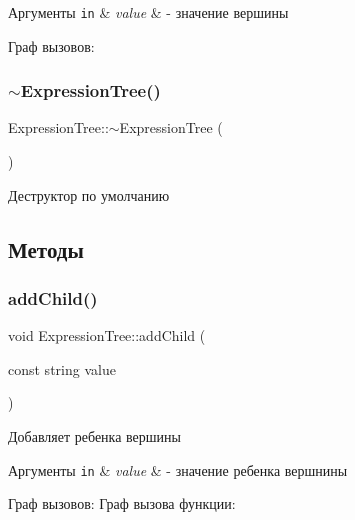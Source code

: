 \begin{DoxyParams}[1]{Аргументы}
\mbox{\tt in}  & {\em value} & -\/ значение вершины \\
\hline
\end{DoxyParams}
Граф вызовов\+:
\mbox{\label{class_expression_tree_a7c172d77927af5a57fded65b1777fc17}} 
\subsubsection{\texorpdfstring{$\sim$\+Expression\+Tree()}{~ExpressionTree()}}
{\footnotesize\ttfamily Expression\+Tree\+::$\sim$\+Expression\+Tree (\begin{DoxyParamCaption}{ }\end{DoxyParamCaption})}



Деструктор по умолчанию 



\subsection{Методы}
\mbox{\label{class_expression_tree_a1c8682a7b97a3e8a9834e545b944c61d}} 
\subsubsection{\texorpdfstring{add\+Child()}{addChild()}\hspace{0.1cm}{\footnotesize\ttfamily [1/2]}}
{\footnotesize\ttfamily void Expression\+Tree\+::add\+Child (\begin{DoxyParamCaption}\item[{const string}]{value }\end{DoxyParamCaption})}



Добавляет ребенка вершины 


\begin{DoxyParams}[1]{Аргументы}
\mbox{\tt in}  & {\em value} & -\/ значение ребенка вершнины \\
\hline
\end{DoxyParams}
Граф вызовов\+:
Граф вызова функции\+:
\mbox{\label{class_expression_tree_a5bc1b25f4ae25975bf086ebf3a95d6e7}} 
